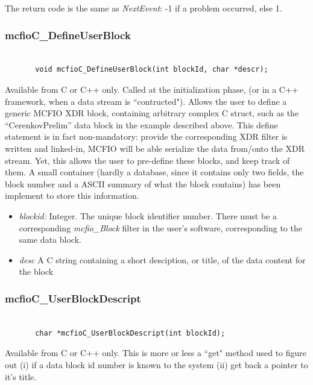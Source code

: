 The return code is the same as {\em NextEvent}: -1 if a problem occurred,
else 1.

\subsubsection{mcfioC\_DefineUserBlock}

\begin{verbatim}

       void mcfioC_DefineUserBlock(int blockId, char *descr);

\end{verbatim}

	Available from C or C++ only. Called at the initialization phase,  (or
in a C++ framework, when a data stream is ``contructed"). Allows the user to
define a generic MCFIO XDR block, containing arbitrary complex C struct, such
as the ``CerenkovPrelim'' data block in the example described above. This
define statement is in fact  non-mandatory: provide the corresponding XDR
filter is written and linked-in,  MCFIO will be able serialize the data
from/onto the XDR stream. Yet, this  allows the user to pre-define these
blocks, and keep track of them. A small  container (hardly a database, since it
contains only two fields, the block number and a ASCII summary of what the
block contains) has been implement  to store this information.

\begin{itemize}
\item{\em blockid:} Integer. The unique block identifier number. There must be a
corresponding {\em mcfio\_Block} filter in the user's software, corresponding to
the same data block.
\item {\em desc} A C string containing a short desciption, or title, of the data
content for the block
\end{itemize}

\subsubsection{mcfioC\_UserBlockDescript}

\begin{verbatim}

       char *mcfioC_UserBlockDescript(int blockId);

\end{verbatim}


	Available from C or C++ only.  This is more or less a ``get" method
used to figure out (i) if a data block id number is known to the system
(ii) get back a pointer to it's title.

